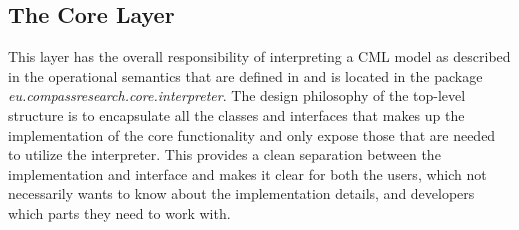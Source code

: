 \documentclass[a4paper, 10pt]{include/compassreport}   %
\begin{document}
\subsection{The Core Layer}
This layer has the overall responsibility of interpreting a CML model
as described in the operational semantics that are defined in
\cite{D23.4} and is located in the package
\emph{eu.compassresearch.core.interpreter}. The design philosophy of
the top-level structure is to encapsulate all the classes and
interfaces that makes up the implementation of the core functionality
and only expose those that are needed to utilize the interpreter. This
provides a clean separation between the implementation and interface
and makes it clear for both the users, which not necessarily wants to
know about the implementation details, and developers which parts they
need to work with.
\end{document}
